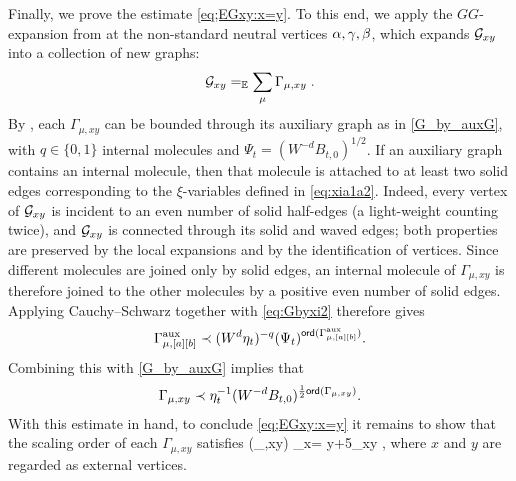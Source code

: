 Finally, we prove the estimate \eqref{eq;EGxy:x=y}. To this end, we apply the $GG$-expansion from  at the non-standard neutral vertices $\al,\gamma,\beta$, which expands $\cal G_{xy}$ into a collection of new graphs:
\begin{align*}
    \cal G_{xy}=_{\E} \sum_\mu \Gamma_{\mu,xy} \; .
\end{align*}
By , each $\Gamma_{\mu,xy}$ can be bounded through its auxiliary graph \smash{$\Gamma^{\aux}_{\mu,[a][b]}$} as in \eqref{G_by_auxG}, with $q\in\{0,1\}$ internal molecules and $\Psi_t=(W^{-d}B_{t,0})^{1/2}$. 
If an auxiliary graph contains an internal molecule, then that molecule is attached to at least two solid edges corresponding to the $\xi$-variables defined in \eqref{eq:xia1a2}. Indeed, every vertex of $\cal G_{xy}$ is incident to an even number of solid half-edges (a light-weight counting twice), and $\cal G_{xy}$ is connected through its solid and waved edges; both properties are preserved by the local expansions and by the identification of vertices. Since different molecules are joined only by solid edges, an internal molecule of $\Gamma_{\mu,xy}$ is therefore joined to the other molecules by a positive even number of solid edges. Applying Cauchy--Schwarz together with \eqref{eq:Gbyxi2} therefore gives
\[ \Gamma^{\aux}_{\mu, [a][b]} \prec (W^d\eta_t)^{-q}(\Psi_t)^{\ord(\Gamma^{\aux}_{\mu, [a][b]})}. \]
Combining this with \eqref{G_by_auxG} implies that %
\begin{align}\label{Gammamuxy}
    \Gamma_{\mu, xy} \prec \eta_t^{-1} (W^{-d}B_{t,0})^{\frac12\ord(\Gamma_{\mu, xy})} .%
\end{align}
With this estimate in hand, to conclude \eqref{eq;EGxy:x=y} it remains to show that the scaling order of each $\Gamma_{\mu,xy}$ satisfies
\be\label{eq:sizeGammamu_E}
\ord(\Gamma_{\mu,xy}) \cdot {}_{x= y}+5\cdot {}_{x\ne y} , 
\ee
where $x$ and $y$ are regarded as external vertices.


